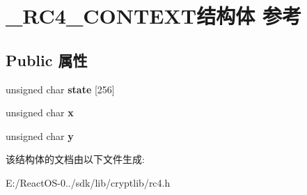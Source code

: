 \hypertarget{struct___r_c4___c_o_n_t_e_x_t}{}\section{\+\_\+\+R\+C4\+\_\+\+C\+O\+N\+T\+E\+X\+T结构体 参考}
\label{struct___r_c4___c_o_n_t_e_x_t}
\subsection*{Public 属性}
\begin{DoxyCompactItemize}
\item 
\mbox{\label{struct___r_c4___c_o_n_t_e_x_t_aa79c20ebabb257338e1dcb672796a408}} 
unsigned char {\bfseries state} \mbox{[}256\mbox{]}
\item 
\mbox{\label{struct___r_c4___c_o_n_t_e_x_t_a7ca45c91326003cc5400eab1a2656171}} 
unsigned char {\bfseries x}
\item 
\mbox{\label{struct___r_c4___c_o_n_t_e_x_t_a365951b187a451440d3ea8af028b1da5}} 
unsigned char {\bfseries y}
\end{DoxyCompactItemize}


该结构体的文档由以下文件生成\+:\begin{DoxyCompactItemize}
\item 
E\+:/\+React\+O\+S-\/0../sdk/lib/cryptlib/rc4.\+h\end{DoxyCompactItemize}
